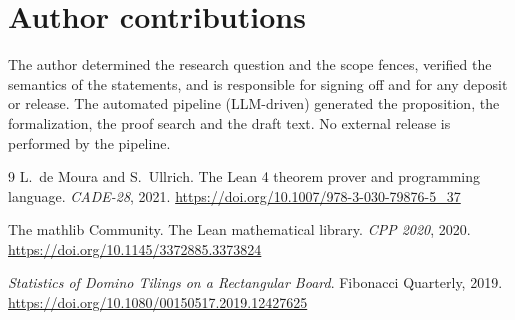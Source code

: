 \documentclass[11pt]{article}
\begin{document}
\section*{Author contributions}
The author determined the research question and the scope fences, verified the semantics of
the statements, and is responsible for signing off and for any deposit or release. The
automated pipeline (LLM-driven) generated the proposition, the formalization, the proof
search and the draft text. No external release is performed by the pipeline.

\begin{thebibliography}{9}
L.~de Moura and S.~Ullrich.
\newblock The Lean 4 theorem prover and programming language.
\newblock \emph{CADE-28}, 2021. \url{https://doi.org/10.1007/978-3-030-79876-5_37}

The mathlib Community.
\newblock The Lean mathematical library.
\newblock \emph{CPP 2020}, 2020. \url{https://doi.org/10.1145/3372885.3373824}

\emph{Statistics of Domino Tilings on a Rectangular Board}.
\newblock Fibonacci Quarterly, 2019.
\newblock \url{https://doi.org/10.1080/00150517.2019.12427625}
\end{thebibliography}
\end{document}
